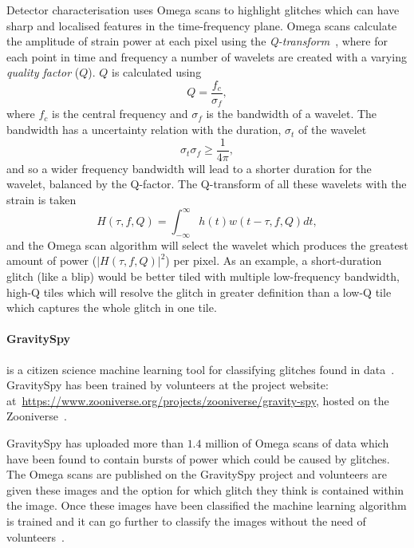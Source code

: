 Detector characterisation uses Omega scans to highlight glitches which can have sharp and localised features in the time-frequency plane. Omega scans calculate the amplitude of strain power at each pixel using the \textit{Q-transform}~\cite{qscan:2004}, where for each point in time and frequency a number of wavelets are created with a varying \textit{quality factor} ($Q$). $Q$ is calculated using
%
\begin{equation}
    Q = \frac{f_{c}}{\sigma_{f}},
\end{equation}
%
where $f_{c}$ is the central frequency and $\sigma_{f}$ is the bandwidth of a wavelet. The bandwidth has a uncertainty relation with the duration, $\sigma_{t}$ of the wavelet
%
\begin{equation}
    \sigma_{t} \sigma_{f} \ge \frac{1}{4\pi},
\end{equation}
%
and so a wider frequency bandwidth will lead to a shorter duration for the wavelet, balanced by the Q-factor. The Q-transform of all these wavelets with the \gwadj strain is taken
%
\begin{equation}
    H(\tau, f, Q) = \int^{\infty}_{-\infty} h(t) w(t - \tau, f, Q) dt,
\end{equation}
%
and the Omega scan algorithm will select the wavelet which produces the greatest amount of power ($|H(\tau, f, Q)|^{2}$) per pixel. As an example, a short-duration glitch (like a blip) would be better tiled with multiple low-frequency bandwidth, high-Q tiles which will resolve the glitch in greater definition than a low-Q tile which captures the whole glitch in one tile.

\paragraph{GravitySpy}

is a citizen science machine learning tool for classifying glitches found in \gwadj data~\cite{gravityspy:2017}. GravitySpy has been trained by volunteers at the project website: at~\href{https://www.zooniverse.org/projects/zooniverse/gravity-spy}{https://www.zooniverse.org/projects/zooniverse/gravity-spy}, hosted on the Zooniverse~\cite{zooniverse}.

GravitySpy has uploaded more than $1.4$ million of Omega scans of \gwadj data which have been found to contain bursts of power which could be caused by glitches. The Omega scans are published on the GravitySpy project and volunteers are given these images and the option for which glitch they think is contained within the image. Once these images have been classified the machine learning algorithm is trained and it can go further to classify the images without the need of volunteers~\cite{gravityspy:2021}.


